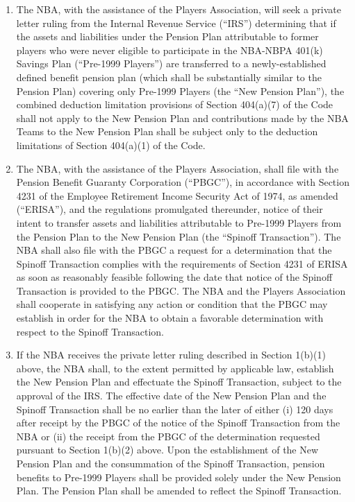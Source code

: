 \documentclass[
]{book}
\providecommand{\tightlist}{%
  \setlength{\itemsep}{0pt}\setlength{\parskip}{0pt}}
\begin{document}
\begin{enumerate}
  \begin{enumerate}
  \def\labelenumii{(\arabic{enumii})}
  \tightlist
  \item
    The NBA, with the assistance of the Players Association, will seek a private letter ruling from the Internal Revenue Service (``IRS'') determining that if the assets and liabilities under the Pension Plan attributable to former players who were never eligible to participate in the NBA-NBPA 401(k) Savings Plan (``Pre-1999 Players'') are transferred to a newly-established defined benefit pension plan (which shall be substantially similar to the Pension Plan) covering only Pre-1999 Players (the ``New Pension Plan''), the combined deduction limitation provisions of Section 404(a)(7) of the Code shall not apply to the New Pension Plan and contributions made by the NBA Teams to the New Pension Plan shall be subject only to the deduction limitations of Section 404(a)(1) of the Code.
  \item
    The NBA, with the assistance of the Players Association, shall file with the Pension Benefit Guaranty Corporation (``PBGC''), in accordance with Section 4231 of the Employee Retirement Income Security Act of 1974, as amended (``ERISA''), and the regulations promulgated thereunder, notice of their intent to transfer assets and liabilities attributable to Pre-1999 Players from the Pension Plan to the New Pension Plan (the ``Spinoff Transaction''). The NBA shall also file with the PBGC a request for a determination that the Spinoff Transaction complies with the requirements of Section 4231 of ERISA as soon as reasonably feasible following the date that notice of the Spinoff Transaction is provided to the PBGC. The NBA and the Players Association shall cooperate in satisfying any action or condition that the PBGC may establish in order for the NBA to obtain a favorable determination with respect to the Spinoff Transaction.
  \item
    If the NBA receives the private letter ruling described in Section 1(b)(1) above, the NBA shall, to the extent permitted by applicable law, establish the New Pension Plan and effectuate the Spinoff Transaction, subject to the approval of the IRS. The effective date of the New Pension Plan and the Spinoff Transaction shall be no earlier than the later of either (i) 120 days after receipt by the PBGC of the notice of the Spinoff Transaction from the NBA or (ii) the receipt from the PBGC of the determination requested pursuant to Section 1(b)(2) above. Upon the establishment of the New Pension Plan and the consummation of the Spinoff Transaction, pension benefits to Pre-1999 Players shall be provided solely under the New Pension Plan. The Pension Plan shall be amended to reflect the Spinoff Transaction.

\end{enumerate}
\end{enumerate}
\end{document}
